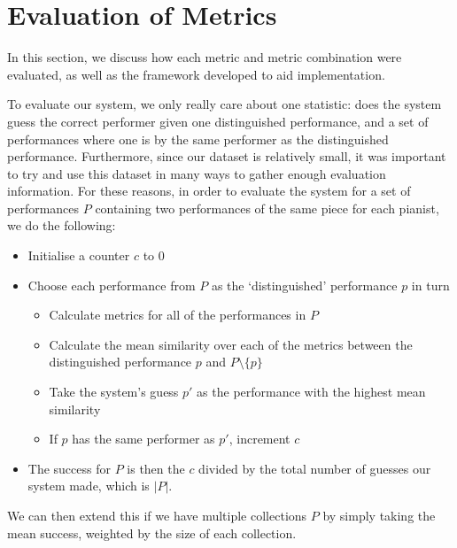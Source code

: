 \documentclass[oneside, class=book, 12pt, crop=false]{standalone}
\begin{document}
\section{Evaluation of Metrics}

In this section, we discuss how each metric and metric combination were evaluated, as well as the framework developed to aid implementation.

To evaluate our system, we only really care about one statistic: does the system guess the correct performer given one distinguished performance, and a set of performances where one is by the same performer as the distinguished performance. Furthermore, since our dataset is relatively small, it was important to try and use this dataset in many ways to gather enough evaluation information. For these reasons, in order to evaluate the system for a set of performances $P$ containing two performances of the same piece for each pianist, we do the following:

\begin{itemize}
  \item
    Initialise a counter $c$ to 0

  \item
    Choose each performance from $P$ as the `distinguished' performance $p$ in turn

    \begin{itemize}
        

      \item
        Calculate metrics for all of the performances in $P$

      \item
        Calculate the mean similarity over each of the metrics between the distinguished performance $p$ and  $P \setminus \{p\}$

      \item
        Take the system's guess $p'$ as the performance with the highest mean similarity
      \item
        If $p$ has the same performer as $p'$, increment $c$
    \end{itemize}

  \item
    The success for $P$ is then the $c$ divided by the total number of guesses our system made, which is $|P|$.
\end{itemize}

We can then extend this if we have multiple collections $P$ by simply taking the mean success, weighted by the size of each collection.
\end{document}
